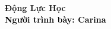 \begin{frame}[noframenumbering]
    \thispagestyle{empty}
    \bfseries
    \begin{flushleft}
        \vfill
        \vspace{5mm}
        \textcolor{BlueDefault}{\huge \bfseries Động Lực Học } \\
        \vspace{8mm}
        \textcolor{black}{\large \bfseries Người trình bày: Carina }
        \vfill
    \end{flushleft}
\end{frame}